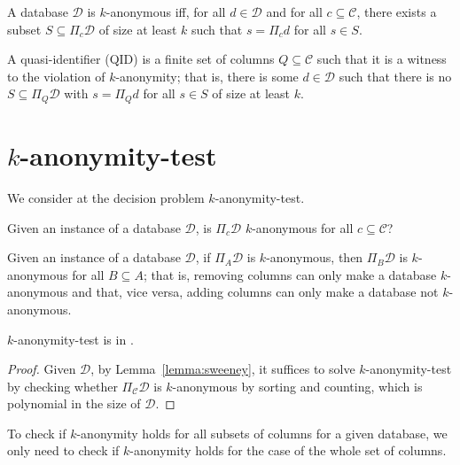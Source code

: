 \documentclass[12pt]{llncs}
\newcommand{\cC}{\mathcal{C}}
\newcommand{\cD}{\mathcal{D}}
\newcommand{\Proj}[1]{\Pi_{#1}}
\begin{document}
\begin{definition}[$k$-anonymity]
A database $\cD$ is $k$-anonymous iff, for all $d \in \cD$ and for all $c \subseteq \cC$, there exists a subset $S \subseteq \Proj{c} \cD$ of size at least $k$ such that $s = \Proj{c} d$ for all $s \in S$.
\end{definition}

\begin{definition}
A quasi-identifier (QID) is a finite set of columns $Q \subseteq \cC$ such that it is a witness to the violation of $k$-anonymity; that is, there is some $d \in \cD$ such that there is no $S \subseteq \Proj{Q} \cD$ with $s = \Proj{Q} d$ for all $s \in S$ of size at least $k$.
\end{definition}

\section{$k$-anonymity-test}

We consider at the decision problem $k$-anonymity-test.

\begin{problem}
Given an instance of a database $\cD$, is $\Proj{c} \cD$ $k$-anonymous for all $c \subseteq \cC$?
\end{problem}

\begin{lemma}
Given an instance of a database $\cD$, if $\Proj{A} \cD$ is $k$-anonymous, then $\Proj{B} \cD$ is $k$-anonymous for all $B \subseteq A$; that is, removing columns can only make a database $k$-anonymous and that, vice versa, adding columns can only make a database not $k$-anonymous.
\label{lemma:sweeney}
\end{lemma}

\begin{proposition}
$k$-anonymity-test is in .
\end{proposition}

\begin{proof}
Given $\cD$, by Lemma~\ref{lemma:sweeney}, it suffices to solve $k$-anonymity-test by checking whether $\Proj{\cC} \cD$ is $k$-anonymous by sorting and counting, which is polynomial in the size of $\cD$.
\end{proof}

\begin{corollary}
To check if $k$-anonymity holds for all subsets of columns for a given database, we only need to check if $k$-anonymity holds for the case of the whole set of columns.
\end{corollary}
\end{document}
